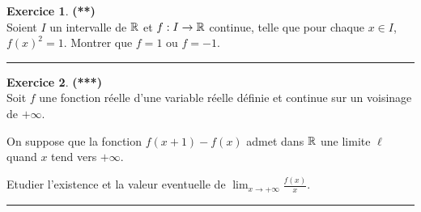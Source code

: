 \documentclass[a4paper,11pt]{article}
\theoremstyle{definition}
\newtheorem{exo}{Exercice} %
\begin{document}
\begin{minipage}[t]{1\linewidth}
\begin{minipage}[t]{0.48\linewidth}
		
		
		\begin{exo}\textbf{(**)}\quad\\[0.2cm]
			Soient $I$ un intervalle de $\mathbb{R}$ et $f : I \rightarrow \mathbb{R}$ continue, telle que pour chaque $x \in I$, $f (x)^2 = 1$.
			Montrer que $f = 1$  ou $f = -1$.
			
			\centering
			\rule{1\linewidth}{0.6pt}
		\end{exo}
	
			\begin{exo}\textbf{(***)}\quad\\[0.2cm]
		Soit $f$ une fonction réelle d'une variable réelle définie et continue sur un voisinage de $+\infty$. 
		
		On suppose que la fonction $f(x+1)-f(x)$ admet dans $\mathbb{R}$ une limite $\ell$ quand $x$ tend vers $+\infty$. 
		
		Etudier l'existence et la valeur eventuelle de $\lim_{x\rightarrow +\infty}\frac{f(x)}{x}$.
		
		\centering
		\rule{1\linewidth}{0.6pt}
	\end{exo}
		

		
	\end{minipage}
\end{minipage}



\medskip		
\end{document}
